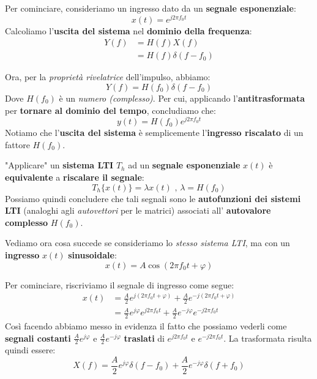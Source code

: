 Per cominciare, consideriamo un ingresso dato da un \textbf{segnale esponenziale}:
\[
    x(t) = e^{j 2\pi f_{0}t}
\]
Calcoliamo l'\textbf{uscita del sistema} nel \textbf{dominio della frequenza}:
\[
    \begin{aligned}
        Y(f) &= H(f) X(f) \\ 
             &= H(f) \delta(f-f_{0})
    \end{aligned}
\]

Ora, per la \textit{proprietà rivelatrice} dell'impulso, abbiamo:
\[
    Y(f) = H(f_{0})\delta(f-f_{0})
\]
Dove $H(f_{0})$ è un \textit{numero (complesso)}. Per cui, applicando l'\textbf{antitrasformata} per 
\textbf{tornare al dominio del tempo}, concludiamo che:
\[
    y(t) = H(f_{0}) e^{j 2\pi f_{0}t}
\]
Notiamo che l'\textbf{uscita del sistema} è semplicemente l'\textbf{ingresso riscalato}
di un fattore $H(f_{0})$.

\begin{remark}
    "Applicare" un \textbf{sistema LTI} $T_h$ ad un \textbf{segnale esponenziale} $x(t)$ è 
    \textbf{equivalente} a \textbf{riscalare il segnale}:
    \[
        T_h \{x(t)\} = \lambda x(t) \text{ , } \lambda = H(f_{0})
    \] 
    Possiamo quindi concludere che tali segnali sono le \textbf{autofunzioni dei sistemi LTI}
    (analoghi agli \textit{autovettori} per le matrici) associati all'
    \textbf{autovalore complesso} $H(f_{0})$.
\end{remark}

Vediamo ora cosa succede se consideriamo lo \textit{stesso sistema LTI}, ma con un
\textbf{ingresso} $x(t)$ \textbf{sinusoidale}:
\[
    x(t) = A \cos(2\pi f_{0}t + \varphi )
\] 

Per cominciare, riscriviamo il segnale di ingresso come segue:
\[
    \begin{aligned}
        x(t) &=\frac{A}{2} e^{j(2\pi f_{0}t + \varphi )} + \frac{A}{2} e^{-j(2\pi f_{0}t + \varphi )} \\ 
             &=\frac{A}{2} e^{j \varphi } e^{j 2\pi f_{0}t} + \frac{A}{2} e^{-j \varphi } e^{-j 2\pi f_{0}t}
    \end{aligned}
\]
Così facendo abbiamo messo in evidenza il fatto che possiamo vederli come \textbf{segnali costanti} 
$\frac{A}{2} e^{j \varphi}$ e $\frac{A}{2} e^{-j \varphi}$ \textbf{traslati} di 
$e^{j 2\pi f_{0} t}$ e $e^{-j 2\pi f_{0} t}$. La trasformata risulta quindi essere:
\[
    X(f) = \frac{A}{2} e^{j \varphi } \delta(f-f_{0}) + \frac{A}{2} e^{-j \varphi } \delta(f+f_{0})
\]

